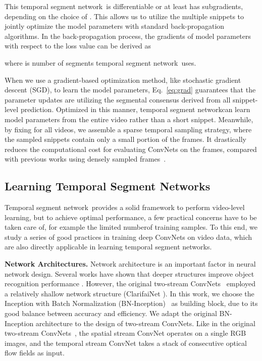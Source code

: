 \documentclass[runningheads]{llncs}
\newcommand{\SEGNET}{temporal segment network}
\begin{document}
This \SEGNET~is differentiable or at least has subgradients, depending on the choice of .
This allows us to utilize the multiple snippets to jointly optimize the model parameters  with standard back-propagation algorithms.
In the back-propagation process, the gradients of model parameters  with respect to the loss value  can be derived as

where  is number of segments \SEGNET~uses.

When we use a gradient-based optimization method, like stochastic gradient descent (SGD), to learn the model parameters, Eq.~\ref{eq:grad} guarantees that the parameter updates are utilizing the segmental consensus  derived from all snippet-level prediction.
Optimized in this manner, \SEGNET  can learn model parameters from the entire video rather than a short snippet. 
Meanwhile, by fixing  for all videos, we assemble a sparse temporal sampling strategy, where the sampled snippets contain only a small portion of the frames.
It drastically reduces the computational cost for evaluating ConvNets on the frames, compared with previous works using densely sampled frames~\cite{Ng15,varol,DonahueJ2015}.

\subsection{Learning Temporal Segment Networks}\label{sec:training}

Temporal segment network~provides a solid framework to perform video-level learning, but to achieve optimal performance, a few practical concerns have to be taken care of, for example the limited numberof training samples.
To this end, we study a series of good practices in training deep ConvNets on video data, which are also directly applicable in learning \SEGNET s.

\textbf{Network Architectures.}
Network architecture is an important factor in neural network design. Several works have shown that deeper structures improve object recognition performance \cite{SimonyanZ14a,SzegedyLJSRAEVR14}. However, the original two-stream ConvNets~\cite{SimonyanZ14} employed a relatively shallow network structure (ClarifaiNet \cite{ZeilerF14}).
In this work, we choose the Inception with Batch Normalization (BN-Inception)~\cite{IoffeS15} as building block, due to its good balance between accuracy and efficiency.
We adapt the original BN-Inception architecture to the design of two-stream ConvNets. Like in the original two-stream ConvNets~\cite{SimonyanZ14}, the spatial stream ConvNet operates on a single RGB images, and the temporal stream ConvNet takes a stack of consecutive optical flow fields as input. 
\end{document}
